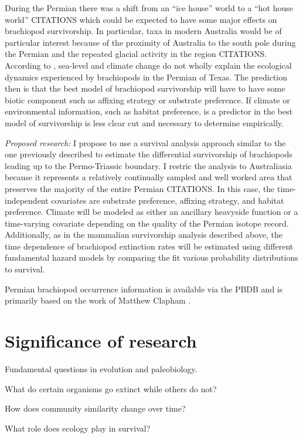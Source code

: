 \documentclass[12pt,letterpaper]{article}
\begin{document}
During the Permian there was a shift from an ``ice house'' world to a ``hot house world'' CITATIONS which could be expected to have some major effects on brachiopod survivorship. In particular, taxa in modern Australia would be of particular interest because of the proximity of Australia to the south pole during the Permian and the repeated glacial activity in the region CITATIONS. According to \citet{Olszewski2004}, sea-level and climate change do not wholly explain the ecological dynamics experienced by brachiopods in the Permian of Texas. The prediction then is that the best model of brachiopod survivorship will have to have some biotic component such as affixing strategy or substrate preference. If climate or environmental information, such as habitat preference, is a predictor in the best model of survivorship is less clear cut and necessary to determine empirically.

\textit{Proposed research:}
I propose to use a survival analysis approach similar to the one previously described to estimate the differential survivorship of brachiopods leading up to the Permo-Triassic boundary. I restric the analysis to Australiasia because it represents a relatively continually sampled and well worked area that preserves the majority of the entire Permian CITATIONS. In this case, the time-independent covariates are substrate preference, affixing strategy, and habitat preference. Climate will be modeled as either an ancillary heavyside function or a time-varying covariate depending on the quality of the Permian isotope record. Additionally, as in the mammalian survivorship analysis described above, the time dependence of brachiopod extinction rates will be estimated using different fundamental hazard models by comparing the fit various probability distributions to survival.

Permian brachiopod occurrence information is available via the PBDB and is primarily based on the work of Matthew Clapham \citep{Clapham2006,Clapham2008a,Clapham2007a,Clapham2012,Clapham2007}.


\section{Significance of research}
Fundamental questions in evolution and paleobiology. 

What do certain organisms go extinct while others do not?

How does community similarity change over time?

What role does ecology play in survival?
\end{document}
